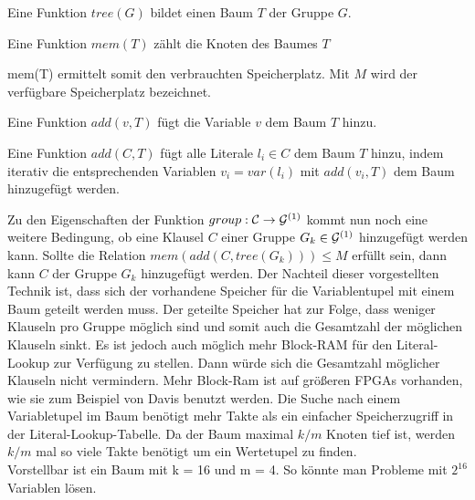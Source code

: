 \begin{function}
  Eine Funktion $tree(G)$ bildet einen Baum $T$ der Gruppe $G$.
\end{function}
\begin{function}
  Eine Funktion $mem(T)$ zählt die Knoten des Baumes $T$
\end{function}
mem(T) ermittelt somit den verbrauchten Speicherplatz. Mit $M$ wird
der verfügbare Speicherplatz bezeichnet.
\begin{function}
  Eine Funktion $add(v, T)$ fügt die Variable $v$ dem Baum $T$ hinzu.
\end{function}
\begin{function}
  Eine Funktion $add(C, T)$ fügt alle Literale $l_i \in C$
  dem Baum $T$ hinzu, indem iterativ die entsprechenden Variablen $v_i = var(l_i)$
  mit $add(v_i, T)$ dem Baum hinzugefügt werden.
\end{function}
Zu den Eigenschaften der Funktion $group: {\cal C} \rightarrow {\cal G}^{(1)}$
kommt nun noch eine weitere Bedingung, ob eine Klausel $C$ einer Gruppe $G_k \in {\cal G}^{(1)}$
hinzugefügt werden kann. Sollte die Relation $mem(add(C, tree(G_k))) \leq M$ erfüllt sein,
dann kann $C$ der Gruppe $G_k$ hinzugefügt werden.
Der Nachteil dieser vorgestellten Technik ist, dass sich der vorhandene Speicher 
für die Variablentupel mit einem Baum geteilt werden muss. Der geteilte Speicher hat zur
Folge, dass weniger Klauseln pro Gruppe möglich sind und somit
auch die Gesamtzahl der möglichen Klauseln sinkt. Es ist jedoch
auch möglich mehr Block-RAM für den Literal-Lookup zur Verfügung
zu stellen. Dann würde sich die Gesamtzahl möglicher Klauseln
nicht vermindern. Mehr Block-Ram ist auf größeren FPGAs
vorhanden, wie sie zum Beispiel von Davis \cite{davis:2008} benutzt werden.
Die Suche nach einem Variabletupel im Baum benötigt mehr Takte
als ein einfacher Speicherzugriff in der Literal-Lookup-Tabelle.
Da der Baum maximal $k/m$ Knoten tief ist, werden 
$k/m$ mal so viele Takte benötigt um ein Wertetupel zu finden.\\
Vorstellbar ist ein Baum mit k = 16 und m = 4. So könnte man 
Probleme mit $2^{16}$ Variablen lösen.

